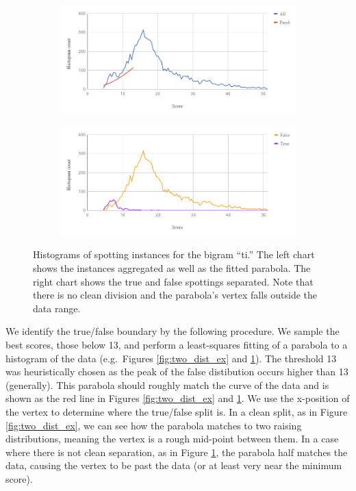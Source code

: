 \documentclass[ms,electronic,twosidetoc,letterpaper,chaptercenter,parttop,lof,lot]{byumsphd}
\begin{document}
\begin{figure}
    \centering
    \begin{subfigure}{.89\textwidth}
  		\centering
  		\includegraphics[width=.99\linewidth]{one_dist_ex_All}
	\end{subfigure}
	\begin{subfigure}{.89\textwidth}
  		\centering
  		\includegraphics[width=.99\linewidth]{one_dist_ex_TF}
	\end{subfigure}
    \caption{Histograms of spotting instances for the bigram ``ti.'' The left chart shows the instances aggregated as well as the fitted parabola. The right chart shows the true and false spottings separated. Note that there is no clean division and the parabola's vertex falls outside the data range.
    }
    \label{fig:one_dist_ex}
\end{figure}

We identify the true/false boundary by the following procedure. We sample the best scores, those below 13, and perform a least-squares fitting of a parabola to a histogram of the data (e.g.~Figures \ref{fig:two_dist_ex} and \ref{fig:one_dist_ex}). The threshold 13 was heuristically chosen as the peak of the false distibution occurs higher than 13 (generally). This parabola should roughly match the curve of the data and is shown as the red line in Figures \ref{fig:two_dist_ex} and \ref{fig:one_dist_ex}. We use the x-position of the vertex to determine where the true/false split is. In a clean split, as in Figure \ref{fig:two_dist_ex}, we can see how the parabola matches to two raising distributions, meaning the vertex is a rough mid-point between them. In a case where there is not clean separation, as in Figure \ref{fig:one_dist_ex}, the parabola half matches the data, causing the vertex to be past the data (or at least very near the minimum score).
\end{document}
